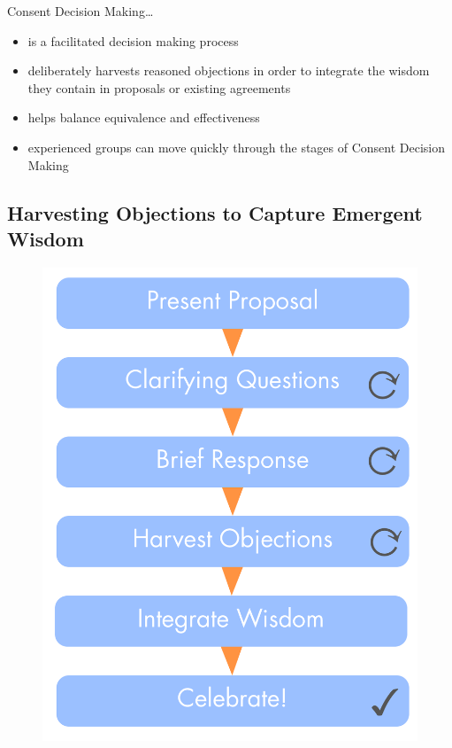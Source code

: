Consent Decision Making{\ldots}

\begin{itemize}
\item is a facilitated decision making process

\item deliberately harvests reasoned objections in order to integrate the wisdom they contain in proposals or existing agreements

\item helps balance equivalence and effectiveness

\item experienced groups can move quickly through the stages of Consent Decision Making

\end{itemize}

\subsection{Harvesting Objections to Capture Emergent Wisdom}
\label{harvestingobjectionstocaptureemergentwisdom}

\begin{figure}[htbp]
\centering
\includegraphics[keepaspectratio,width=\textwidth,height=0.75\textheight]{img/consent-decision-making/cdm-small.png}
\end{figure}

